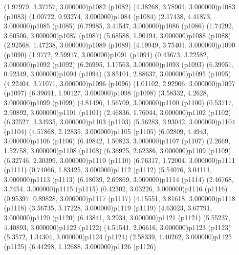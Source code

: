 \psPoint(1.97979, 3.37757, 3.000000){p1082}
\psdot(p1082)
\psPoint(4.38268, 3.78901, 3.000000){p1083}
\psdot(p1083)
\psPoint(1.00722, 0.93274, 3.000000){p1084}
\psdot(p1084)
\psPoint(2.17438, 4.41873, 3.000000){p1085}
\psdot(p1085)
\psPoint(6.79985, 3.41547, 3.000000){p1086}
\psdot(p1086)
\psPoint(1.74292, 3.60506, 3.000000){p1087}
\psdot(p1087)
\psPoint(5.68588, 1.90194, 3.000000){p1088}
\psdot(p1088)
\psPoint(2.92568, 1.47238, 3.000000){p1089}
\psdot(p1089)
\psPoint(4.19949, 3.75401, 3.000000){p1090}
\psdot(p1090)
\psPoint(1.9772, 2.59917, 3.000000){p1091}
\psdot(p1091)
\psPoint(0.43673, 3.22582, 3.000000){p1092}
\psdot(p1092)
\psPoint(6.26995, 1.17563, 3.000000){p1093}
\psdot(p1093)
\psPoint(6.39951, 0.92349, 3.000000){p1094}
\psdot(p1094)
\psPoint(3.85101, 2.88637, 3.000000){p1095}
\psdot(p1095)
\psPoint(4.22404, 3.71071, 3.000000){p1096}
\psdot(p1096)
\psPoint(1.01102, 2.92906, 3.000000){p1097}
\psdot(p1097)
\psPoint(6.39691, 1.90127, 3.000000){p1098}
\psdot(p1098)
\psPoint(3.58332, 4.2628, 3.000000){p1099}
\psdot(p1099)
\psPoint(4.81496, 1.56709, 3.000000){p1100}
\psdot(p1100)
\psPoint(0.53717, 2.90892, 3.000000){p1101}
\psdot(p1101)
\psPoint(2.46836, 1.76044, 3.000000){p1102}
\psdot(p1102)
\psPoint(6.32527, 3.34935, 3.000000){p1103}
\psdot(p1103)
\psPoint(5.56283, 3.93042, 3.000000){p1104}
\psdot(p1104)
\psPoint(4.57868, 2.12835, 3.000000){p1105}
\psdot(p1105)
\psPoint(6.02809, 4.4943, 3.000000){p1106}
\psdot(p1106)
\psPoint(6.49842, 1.50823, 3.000000){p1107}
\psdot(p1107)
\psPoint(2.2669, 1.52758, 3.000000){p1108}
\psdot(p1108)
\psPoint(6.36925, 2.62386, 3.000000){p1109}
\psdot(p1109)
\psPoint(6.32746, 2.30399, 3.000000){p1110}
\psdot(p1110)
\psPoint(6.76317, 1.72004, 3.000000){p1111}
\psdot(p1111)
\psPoint(0.74066, 1.83425, 3.000000){p1112}
\psdot(p1112)
\psPoint(5.54076, 3.04111, 3.000000){p1113}
\psdot(p1113)
\psPoint(6.18039, 2.69869, 3.000000){p1114}
\psdot(p1114)
\psPoint(2.46768, 3.7454, 3.000000){p1115}
\psdot(p1115)
\psPoint(0.42302, 3.03226, 3.000000){p1116}
\psdot(p1116)
\psPoint(0.95397, 0.89828, 3.000000){p1117}
\psdot(p1117)
\psPoint(4.15551, 3.81618, 3.000000){p1118}
\psdot(p1118)
\psPoint(3.56735, 3.17228, 3.000000){p1119}
\psdot(p1119)
\psPoint(4.63023, 3.67791, 3.000000){p1120}
\psdot(p1120)
\psPoint(6.43841, 3.2934, 3.000000){p1121}
\psdot(p1121)
\psPoint(5.55237, 4.40893, 3.000000){p1122}
\psdot(p1122)
\psPoint(4.51541, 2.06616, 3.000000){p1123}
\psdot(p1123)
\psPoint(5.3572, 1.34304, 3.000000){p1124}
\psdot(p1124)
\psPoint(2.58339, 1.40262, 3.000000){p1125}
\psdot(p1125)
\psPoint(6.44298, 1.12688, 3.000000){p1126}
\psdot(p1126)
